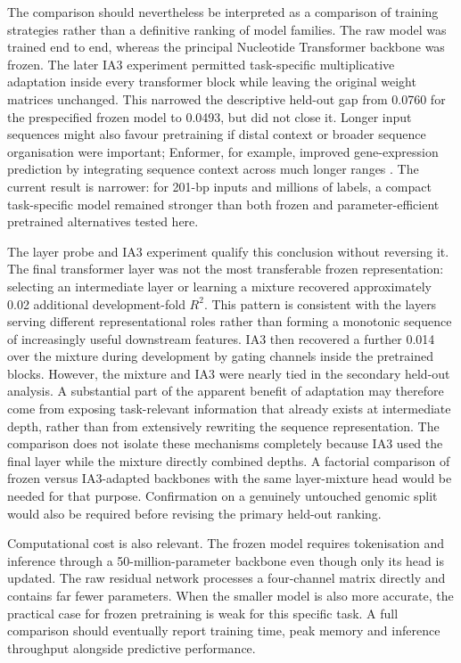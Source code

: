 \documentclass[a4paper,12pt]{article}
\begin{document}
The comparison should nevertheless be interpreted as a comparison of training strategies rather than a definitive ranking of model families. The raw model was trained end to end, whereas the principal Nucleotide Transformer backbone was frozen. The later IA3 experiment permitted task-specific multiplicative adaptation inside every transformer block while leaving the original weight matrices unchanged. This narrowed the descriptive held-out gap from 0.0760 for the prespecified frozen model to 0.0493, but did not close it. Longer input sequences might also favour pretraining if distal context or broader sequence organisation were important; Enformer, for example, improved gene-expression prediction by integrating sequence context across much longer ranges \citep{avsec2021enformer}. The current result is narrower: for 201-bp inputs and millions of labels, a compact task-specific model remained stronger than both frozen and parameter-efficient pretrained alternatives tested here.

The layer probe and IA3 experiment qualify this conclusion without reversing it. The final transformer layer was not the most transferable frozen representation: selecting an intermediate layer or learning a mixture recovered approximately 0.02 additional development-fold $R^2$. This pattern is consistent with the layers serving different representational roles rather than forming a monotonic sequence of increasingly useful downstream features. IA3 then recovered a further 0.014 over the mixture during development by gating channels inside the pretrained blocks. However, the mixture and IA3 were nearly tied in the secondary held-out analysis. A substantial part of the apparent benefit of adaptation may therefore come from exposing task-relevant information that already exists at intermediate depth, rather than from extensively rewriting the sequence representation. The comparison does not isolate these mechanisms completely because IA3 used the final layer while the mixture directly combined depths. A factorial comparison of frozen versus IA3-adapted backbones with the same layer-mixture head would be needed for that purpose. Confirmation on a genuinely untouched genomic split would also be required before revising the primary held-out ranking.

Computational cost is also relevant. The frozen model requires tokenisation and inference through a 50-million-parameter backbone even though only its head is updated. The raw residual network processes a four-channel matrix directly and contains far fewer parameters. When the smaller model is also more accurate, the practical case for frozen pretraining is weak for this specific task. A full comparison should eventually report training time, peak memory and inference throughput alongside predictive performance.
\end{document}
